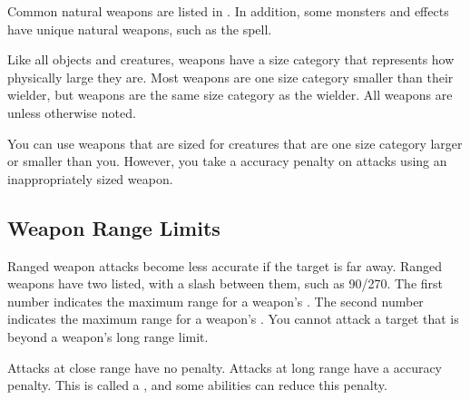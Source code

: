       Common natural weapons are listed in .
      In addition, some monsters and effects have unique natural weapons, such as the  spell.

       Like all objects and creatures, weapons have a size category that represents how physically large they are. Most weapons are one size category smaller than their wielder, but  weapons are the same size category as the wielder.
      All weapons are  unless otherwise noted.

       You can use weapons that are sized for creatures that are one size category larger or smaller than you.
      However, you take a  accuracy penalty on attacks using an inappropriately sized weapon.

  \subsection{Weapon Range Limits}\label{Weapon Range Limits}
    Ranged weapon attacks become less accurate if the target is far away.
    Ranged weapons have two  listed, with a slash between them, such as 90/270.
    The first number indicates the maximum range for a weapon's .
    The second number indicates the maximum range for a weapon's .
    You cannot attack a target that is beyond a weapon's long range limit.

    Attacks at close range have no penalty.
    Attacks at long range have a  accuracy penalty.
    This is called a , and some abilities can reduce this penalty.

